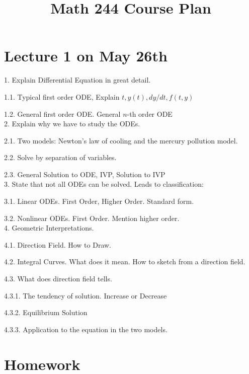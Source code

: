 \documentclass[11pt]{article}
\begin{document}
\setlength{\oddsidemargin}{0cm} \setlength{\evensidemargin}{0cm}
\baselineskip=18pt

\title{Math 244 Course Plan}



\maketitle

\section{Lecture 1 on May 26th}

1. Explain Differential Equation in great detail. 

1.1. Typical first order ODE, Explain $t, y(t), dy/dt, f(t,y)$

1.2. General first order ODE. General $n$-th order ODE\\

2. Explain why we have to study the ODEs. 

2.1. Two models: Newton's law of cooling and the mercury pollution model.

2.2. Solve by separation of variables. 

2.3. General Solution to ODE, IVP, Solution to IVP\\

3. State that not all ODEs can be solved. Leads to classification: 

3.1. Linear ODEs. First Order, Higher Order. Standard form. 

3.2. Nonlinear ODEs. First Order. Mention higher order. \\

4. Geometric Interpretations. 

4.1. Direction Field. How to Draw. 

4.2. Integral Curves. What does it mean. How to sketch from a direction field. 

4.3. What does direction field tells. 

4.3.1. The tendency of solution. Increase or Decrease

4.3.2. Equilibrium Solution

4.3.3. Application to the equation in the two models. 

\newpage

\section*{Homework}
\end{document}
